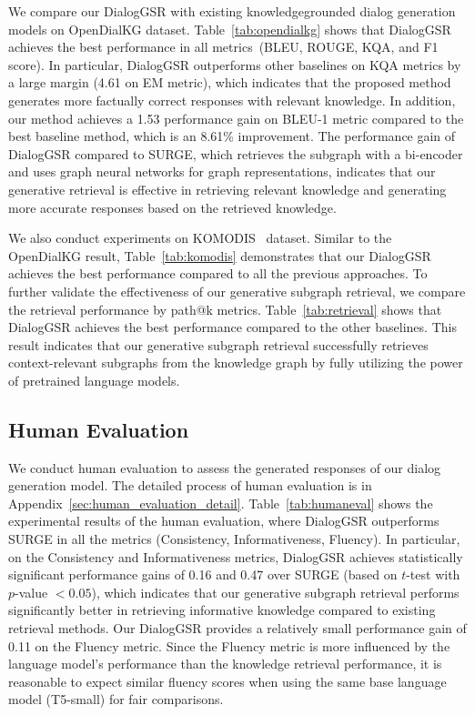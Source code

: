 We compare our DialogGSR with existing knowledge{\textendash}grounded dialog generation models on OpenDialKG dataset. 
Table~\ref{tab:opendialkg} shows that DialogGSR achieves the best performance in all metrics~(BLEU, ROUGE, KQA, and F1 score).
In particular, DialogGSR outperforms other baselines on KQA metrics by a large margin (4.61 on EM metric), which indicates that the proposed method generates more factually correct responses with relevant knowledge.
In addition, our method achieves a 1.53 performance gain on BLEU-1 metric compared to the best baseline method, which is an 8.61\% improvement.  
The performance gain of DialogGSR compared to SURGE, which retrieves the subgraph with a bi-encoder and uses graph neural networks for graph representations, indicates that our generative retrieval is effective in retrieving relevant knowledge and generating more accurate responses based on the retrieved knowledge. 

We also conduct experiments on KOMODIS~\cite{galetzka2020corpus} dataset.
Similar to the OpenDialKG result, Table~\ref{tab:komodis} demonstrates that our DialogGSR achieves the best performance compared to all the previous approaches.
To further validate the effectiveness of our generative subgraph retrieval, we compare the retrieval performance by path@k metrics.
Table~\ref{tab:retrieval} shows that DialogGSR achieves the best performance compared to the other baselines.  
This result indicates that our generative subgraph retrieval successfully retrieves context-relevant subgraphs from the knowledge graph by fully utilizing the power of pretrained language models. 

\subsection{Human Evaluation}
\label{sup_sec:human}
We conduct human evaluation to assess the generated responses of our dialog generation model.
The detailed process of human evaluation is in Appendix~\ref{sec:human_evaluation_detail}.
Table~\ref{tab:humaneval} shows the experimental results of the human evaluation, where DialogGSR outperforms SURGE in all the metrics (Consistency, Informativeness, Fluency). 
In particular, on the Consistency and Informativeness metrics, DialogGSR achieves statistically significant performance gains of 0.16 and 0.47 over SURGE (based on $t$-test with $p$-value $<0.05$), which indicates that our generative subgraph retrieval performs significantly better in retrieving informative knowledge compared to existing retrieval methods.
Our DialogGSR provides a relatively small performance gain of 0.11 on the Fluency metric.
Since the Fluency metric is more influenced by the language model's performance than the knowledge retrieval performance, it is reasonable to expect similar fluency scores when using the same base language model (T5-small) for fair comparisons.